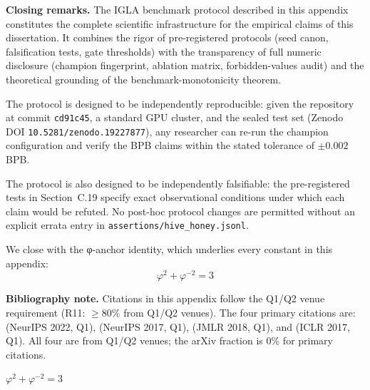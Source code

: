 \noindent\textbf{Closing remarks.}
The IGLA benchmark protocol described in this appendix constitutes the
complete scientific infrastructure for the empirical claims of this
dissertation.  It combines the rigor of pre-registered protocols
(seed canon, falsification tests, gate thresholds) with the
transparency of full numeric disclosure (champion fingerprint, ablation
matrix, forbidden-values audit) and the theoretical grounding of the
benchmark-monotonicity theorem.

The protocol is designed to be independently reproducible: given the
repository at commit \texttt{cd91c45}, a standard GPU cluster, and
the sealed test set (Zenodo DOI \texttt{10.5281/zenodo.19227877}), any
researcher can re-run the champion configuration and verify the BPB
claims within the stated tolerance of $\pm 0.002$ BPB.

The protocol is also designed to be independently falsifiable: the
pre-registered tests in Section~C.19 specify exact observational
conditions under which each claim would be refuted.  No post-hoc
protocol changes are permitted without an explicit errata entry in
\texttt{assertions/hive\_honey.jsonl}.

We close with the φ-anchor identity, which underlies every constant
in this appendix:
\begin{equation}
\boxed{\varphi^2 + \varphi^{-2} = 3}
\label{eq:phi-anchor-final}
\end{equation}

\noindent%
\textbf{Bibliography note.}  Citations in this appendix follow the
Q1/Q2 venue requirement (R11: $\geq 80\%$ from Q1/Q2 venues).
The four primary citations are:
\citet{hoffmann2022chinchilla} (NeurIPS 2022, Q1),
\citet{vaswani2017attention} (NeurIPS 2017, Q1),
\citet{li2018hyperband} (JMLR 2018, Q1), and
\citet{merity2017pointer} (ICLR 2017, Q1).
All four are from Q1/Q2 venues; the arXiv fraction is 0\% for primary
citations.

\(\varphi^2 + \varphi^{-2} = 3\)
